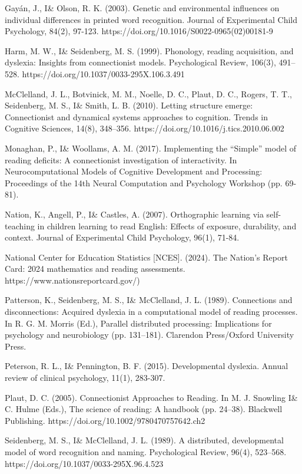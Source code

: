 \documentclass[
  ,man,floatsintext]{apa6}
\begin{document}
\begin{hangparas}{1.5em}{1}
Gayán, J., I\& Olson, R. K. (2003). Genetic and environmental influences on individual differences in printed word recognition. Journal of Experimental Child Psychology, 84(2), 97-123. https://doi.org/10.1016/S0022-0965(02)00181-9

Harm, M. W., I\& Seidenberg, M. S. (1999). Phonology, reading acquisition, and dyslexia: Insights from connectionist models. Psychological Review, 106(3), 491–528. https://doi.org/10.1037/0033-295X.106.3.491

McClelland, J. L., Botvinick, M. M., Noelle, D. C., Plaut, D. C., Rogers, T. T., Seidenberg, M. S., I\& Smith, L. B. (2010). Letting structure emerge: Connectionist and dynamical systems approaches to cognition. Trends in Cognitive Sciences, 14(8), 348–356. https://doi.org/10.1016/j.tics.2010.06.002

Monaghan, P., I\& Woollams, A. M. (2017). Implementing the “Simple” model of reading deficits: A connectionist investigation of interactivity. In Neurocomputational Models of Cognitive Development and Processing: Proceedings of the 14th Neural Computation and Psychology Workshop (pp. 69-81).

Nation, K., Angell, P., I\& Castles, A. (2007). Orthographic learning via self-teaching in children learning to read English: Effects of exposure, durability, and context. Journal of Experimental Child Psychology, 96(1), 71-84.

National Center for Education Statistics [NCES]. (2024). The Nation's Report Card: 2024 mathematics and reading assessments. https://www.nationsreportcard.gov/)

Patterson, K., Seidenberg, M. S., I\& McClelland, J. L. (1989). Connections and disconnections: Acquired dyslexia in a computational model of reading processes. In R. G. M. Morris (Ed.), Parallel distributed processing: Implications for psychology and neurobiology (pp. 131–181). Clarendon Press/Oxford University Press. 

Peterson, R. L., I\& Pennington, B. F. (2015). Developmental dyslexia. Annual review of clinical psychology, 11(1), 283-307.

Plaut, D. C. (2005). Connectionist Approaches to Reading. In M. J. Snowling I\& C. Hulme (Eds.), The science of reading: A handbook (pp. 24–38). Blackwell Publishing. https://doi.org/10.1002/9780470757642.ch2

Seidenberg, M. S., I\& McClelland, J. L. (1989). A distributed, developmental model of word recognition and naming. Psychological Review, 96(4), 523–568. https://doi.org/10.1037/0033-295X.96.4.523


\end{hangparas}
\end{document}
